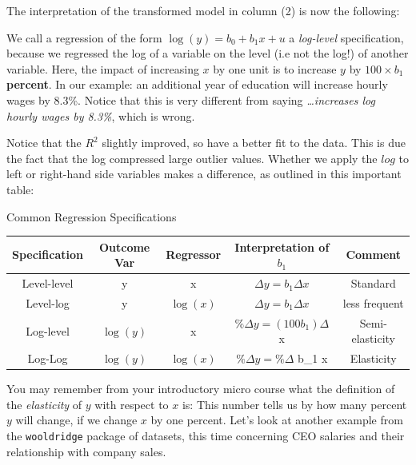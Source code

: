 \documentclass[]{book}
\newenvironment{note}{\begin{tcolorbox}[colback=blue!5!white,colframe=blue!75!black]}{\end{tcolorbox}}
\begin{document}
The interpretation of the transformed model in column (2) is now the following:

\begin{note}
We call a regression of the form \(\log(y) = b_0 + b_1 x + u\) a
\emph{log-level} specification, because we regressed the log of a
variable on the level (i.e not the log!) of another variable. Here, the
impact of increasing \(x\) by one unit is to increase \(y\) by
\(100 \times b_1\) \textbf{percent}. In our example: an additional year
of education will increase hourly wages by 8.3\%. Notice that this is
very different from saying \emph{\ldots increases log hourly wages by
8.3\%}, which is wrong.
\end{note}

Notice that the \(R^2\) slightly improved, so have a better fit to the data. This is due the fact that the log compressed large outlier values. Whether we apply the \(log\) to left or right-hand side variables makes a difference, as outlined in this important table:

\label{tab:loglog} Common Regression Specifications

\begin{longtable}[]{@{}ccccc@{}}
\toprule
Specification & Outcome Var & Regressor & Interpretation of \(b_1\) & Comment\tabularnewline
\midrule
\endhead
Level-level & y & x & \(\Delta y = b_1 \Delta x\) & Standard\tabularnewline
Level-log & y & \(\log(x)\) & \(\Delta y = b_1 \Delta x\) & less frequent\tabularnewline
Log-level & \(\log(y)\) & x & \(\% \Delta y = (100 b_1) \Delta\) x & Semi-elasticity\tabularnewline
Log-Log & \(\log(y)\) & \(\log(x)\) & \(\% \Delta y = \% \Delta\) b\_1 x & Elasticity\tabularnewline
\bottomrule
\end{longtable}

You may remember from your introductory micro course what the definition of the \emph{elasticity} of \(y\) with respect to \(x\) is: This number tells us by how many percent \(y\) will change, if we change \(x\) by one percent. Let's look at another example from the \texttt{wooldridge} package of datasets, this time concerning CEO salaries and their relationship with company sales.
\end{document}
